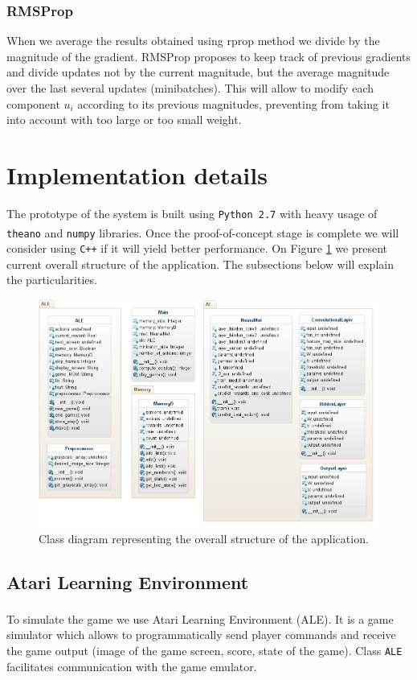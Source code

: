 \documentclass[a4paper,12pt]{article}
\begin{document}
\subsubsection{RMSProp}
When we average the results obtained using rprop method we divide by the magnitude of the gradient. RMSProp proposes to keep track of previous gradients and divide updates not by the current magnitude, but the average magnitude over the last several updates (minibatches). This will allow to modify each component $u_i$ according to its previous magnitudes, preventing from taking it into account with too large or too small weight.


%
%
\pagebreak
\section{Implementation details}
The prototype of the system is built using \texttt{Python 2.7} with heavy usage of \texttt{theano}\textsuperscript{\cite{bergstra2010theano}} and \texttt{numpy}\textsuperscript{\cite{oliphant2007python}} libraries. Once the proof-of-concept stage is complete we will consider using \texttt{C++} if it will yield better performance. On Figure \ref{fig:classdiagram} we present current overall structure of the application. The subsections below will explain the particularities.

\begin{figure}[h]
	\centering
	\includegraphics[width=\textwidth]{images/DeepMind-diag.png}
	\caption{Class diagram representing the overall structure of the application.}
	\label{fig:classdiagram}
\end{figure}


\subsection{Atari Learning Environment}
To simulate the game we use Atari Learning Environment (ALE)\textsuperscript{\cite{bellemare13arcade}}. It is a game simulator which allows to programmatically send player commands and receive the game output (image of the game screen, score, state of the game). Class \texttt{ALE} facilitates communication with the game emulator.
\end{document}
